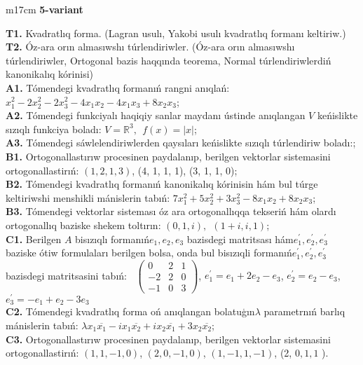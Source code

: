 \documentclass{article}
\begin{document}
\begin{tabular}{m{17cm}}
\textbf{5-variant}
\newline

\textbf{T1.} Kvadratlıq forma. (Lagran usulı, Yakobi usulı kvadratlıq formanı keltiriw.) \\
\textbf{T2.} Óz-ara orın almasıwshı túrlendiriwler. (Óz-ara orın almasıwshı túrlendiriwler,  Ortogonal bazis haqqında teorema,  Normal túrlendiriwlerdiń kanonikalıq kórinisi) \\
\textbf{A1.} Tómendegi kvadratlıq formanıń rangni anıqlań: \(x_{1}^{2} - 2x_{2}^{2} - 2x_{3}^{2} - 4x_{1}x_{2} - 4x_{1}x_{3} + 8x_{2}x_{3}\); \\
\textbf{A2.} Tómendegi funkciyalı haqiqiy sanlar maydanı ústinde anıqlangan \(V\) keńislikte sızıqlı funkciya boladı: \(V = \mathbb{R}^{3},\ \ f(x) = |x|\); \\
\textbf{A3.} Tómendegi sáwlelendiriwlerden qaysıları keńislikte sızıqlı túrlendiriw boladı:; \\
\textbf{B1.} Ortogonallastırıw procesinen paydalanıp, berilgen vektorlar sistemasini ortogonallastirıń: \((1,2,1,3)\), (4, 1, 1, 1), (3, 1, 1, 0); \\
\textbf{B2.} Tómendegi kvadratlıq formanıń kanonikalıq kórinisin hám bul túrge keltiriwshi menshikli mánislerin tabıń: \(7x_{1}^{2} + 5x_{2}^{2} + 3x_{3}^{2} - 8x_{1}x_{2} + 8x_{2}x_{3}\); \\
\textbf{B3.} Tómendegi vektorlar sisteması óz ara ortogonallıqqa tekseriń hám olardı ortogonallıq baziske shekem toltırın: \((0,1,i),\ \ (1 + i,i,1)\); \\
\textbf{C1.} Berilgen \(A\) bisızıqlı formanıń\(e_{1},e_{2},e_{3}\) bazisdegi matritsası hám\(e_{1}^{'},e_{2}^{'},e_{3}^{'}\) baziske ótiw formulaları berilgen bolsa, onda bul bisızıqli formanıń\(e_{1}^{'},e_{2}^{'},e_{3}^{'}\) bazisdegi matritsasini tabıń: \(\ \) \(\begin{pmatrix} 0 & 2 & 1 \\  - 2 & 2 & 0 \\  - 1 & 0 & 3 \end{pmatrix}\), \(e_{1}^{'} = e_{1} + 2e_{2} - e_{3}\), \(e_{2}^{'} = e_{2} - e_{3}\), \(e_{3}^{'} = - e_{1} + e_{2} - 3e_{3}\) \\
\textbf{C2.} Tómendegi kvadratlıq forma oń anıqlangan bolatuģın\(\lambda\) parametrnıń barlıq mánislerin tabıń: \(\lambda x_{1}\overline{x_{1}} - ix_{1}\overline{x_{2}} + ix_{2}\overline{x_{1}} + 3x_{2}\overline{x_{2}}\); \\
\textbf{C3.} Ortogonallastırıw procesinen paydalanıp, berilgen vektorlar sistemasini ortogonallastirıń: \((1,1, - 1,0)\), \((2,0, - 1,0)\), \((1, - 1,1, - 1)\), (2, \(0,1,1\) ). \\

\end{tabular}
\vspace{1cm}
\end{document}
